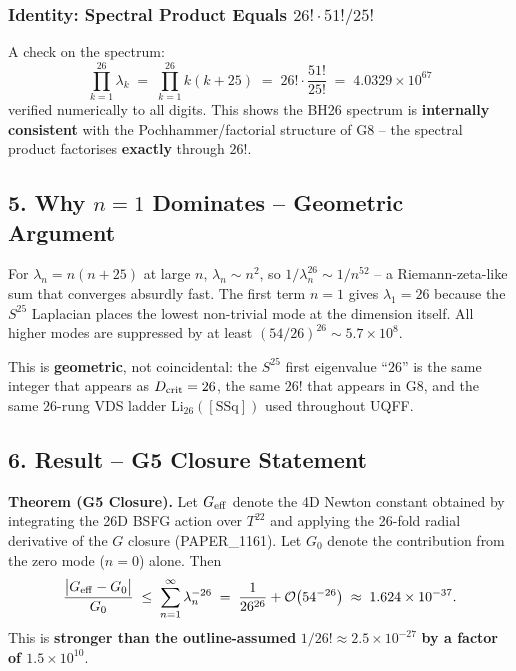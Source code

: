 \documentclass[
]{article}
\begin{document}
\subsubsection{\texorpdfstring{Identity: Spectral Product Equals
\(26!\cdot 51!/25!\)}{Identity: Spectral Product Equals 26!\textbackslash cdot 51!/25!}}\label{identity-spectral-product-equals-26cdot-5125}

A check on the spectrum:
\[\prod_{k=1}^{26}\lambda_k \;=\; \prod_{k=1}^{26} k(k+25) \;=\; 26!\cdot \frac{51!}{25!} \;=\; 4.0329\times 10^{67}\]
verified numerically to all digits. This shows the BH26 spectrum is
\textbf{internally consistent} with the Pochhammer/factorial structure
of G8 -- the spectral product factorises \textbf{exactly} through
\(26!\).

\subsection{\texorpdfstring{5. Why \(n=1\) Dominates -- Geometric
Argument}{5. Why n=1 Dominates -- Geometric Argument}}\label{why-n1-dominates-geometric-argument}

For \(\lambda_n = n(n+25)\) at large \(n\), \(\lambda_n \sim n^2\), so
\(1/\lambda_n^{26} \sim 1/n^{52}\) -- a Riemann-zeta-like sum that
converges absurdly fast. The first term \(n=1\) gives \(\lambda_1 = 26\)
because the \(S^{25}\) Laplacian places the lowest non-trivial mode at
the dimension itself. All higher modes are suppressed by at least
\((54/26)^{26}\sim 5.7\times 10^{8}\).

This is \textbf{geometric}, not coincidental: the \(S^{25}\) first
eigenvalue ``\(26\)'' is the same integer that appears as
\(D_{\rm crit}=26\), the same \(26!\) that appears in G8, and the same
\(26\)-rung VDS ladder \(\mathrm{Li}_{26}([\mathrm{SSq}])\) used
throughout UQFF.

\subsection{6. Result -- G5 Closure
Statement}\label{result-g5-closure-statement}

\textbf{Theorem (G5 Closure).} Let \(G_{\rm eff}\) denote the 4D Newton
constant obtained by integrating the 26D BSFG action over \(T^{22}\) and
applying the 26-fold radial derivative of the \(G\) closure
(PAPER\_1161). Let \(G_{0}\) denote the contribution from the zero mode
(\(n=0\)) alone. Then
\[\frac{\big|G_{\rm eff} - G_{0}\big|}{G_{0}} \;\leq\; \sum_{n=1}^{\infty}\lambda_n^{-26} \;=\; \frac{1}{26^{26}} + \mathcal{O}\!\left(54^{-26}\right) \;\approx\; 1.624\times 10^{-37}.\]
This is \textbf{stronger than the outline-assumed}
\(1/26!\approx 2.5\times 10^{-27}\) \textbf{by a factor of
\(1.5\times 10^{10}\)}.
\end{document}

